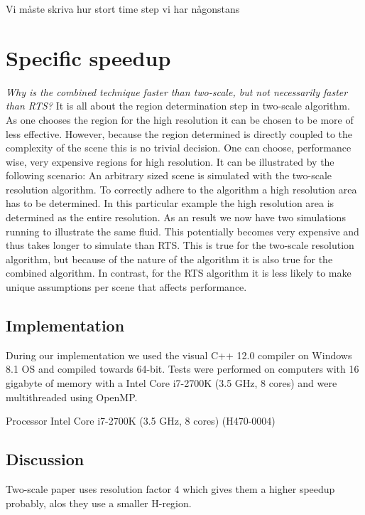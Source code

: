 \documentclass[../../main.tex]{subfiles}
\begin{document}


Vi måste skriva hur stort time step vi har någonstans

\section{Specific speedup}
\textit{Why is the combined technique faster than two-scale, but not necessarily faster than RTS?}
It is all about the region determination step in two-scale algorithm. As one chooses the region for the high resolution it can be chosen to be more of less effective. However, because the region determined is directly coupled to the complexity of the scene this is no trivial decision. One can choose, performance wise, very expensive regions for high resolution. It can be illustrated by the following scenario:
An arbitrary sized scene is simulated with the two-scale resolution algorithm. To correctly adhere to the algorithm a high resolution area has to be determined. In this particular example the high resolution area is determined as the entire resolution. As an result we now have two simulations running to illustrate the same fluid. This potentially becomes very expensive and thus takes longer to simulate than RTS. This is true for the two-scale resolution algorithm, but because of the nature of the algorithm it is also true for the combined algorithm. In contrast, for the RTS algorithm it is less likely to make unique assumptions per scene that affects performance.  


\subsection{Implementation }
During our implementation we used the visual C++ 12.0 compiler on Windows 8.1 OS and compiled towards 64-bit. Tests were performed on computers with 16 gigabyte of memory with a Intel Core i7-2700K (3.5 GHz, 8 cores) and were multithreaded using OpenMP. 

Processor Intel Core i7-2700K (3.5 GHz, 8 cores) (H470-0004)

\subsection{Discussion}

Two-scale paper uses resolution factor 4 which gives them a higher speedup probably, alos they use a smaller H-region. 
\end{document}
